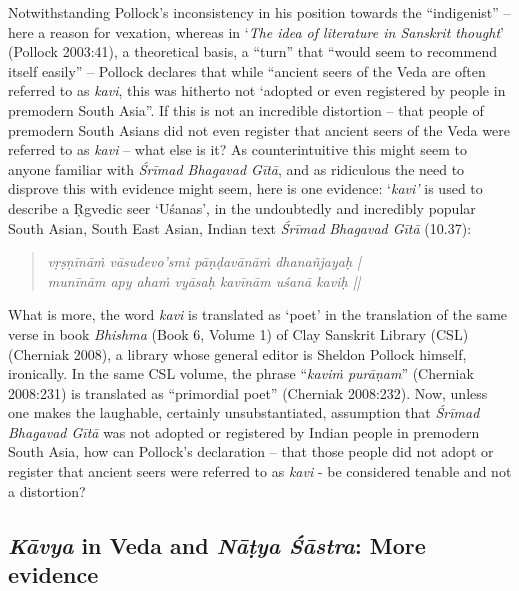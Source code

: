 Notwithstanding Pollock’s inconsistency in his position towards the “indigenist” – here a reason for vexation, whereas in ‘\textit{The idea of literature in Sanskrit thought}’ (Pollock 2003:41), a theoretical basis, a “turn” that “would seem to recommend itself easily” – Pollock declares that while “ancient seers of the Veda are often referred to as \textit{kavi}, this was hitherto not ‘adopted or even registered by people in premodern South Asia”. If this is not an incredible distortion – that people of premodern South Asians did not even register that ancient seers of the Veda were referred to as \textit{kavi} – what else is it? As counterintuitive this might seem to anyone familiar with \textit{Śrīmad Bhagavad Gītā}, and as ridiculous the need to disprove this with evidence might seem, here is one evidence: ‘\textit{kavi’} is used to describe a Ṛgvedic seer ‘Uśanas’, in the undoubtedly and incredibly popular South Asian, South East Asian, Indian text \textit{Śrīmad} \textit{Bhagavad Gītā} (10.37):

\begin{verse}
\textit{vṛṣṇīnāṁ vāsudevo’smi pāṇḍavānāṁ dhanañjayaḥ |}\\\textit{munīnām apy ahaṁ vyāsaḥ kavīnām uśanā kaviḥ ||}
\end{verse}

What is more, the word \textit{kavi} is translated as ‘poet’ in the translation of the same verse in book \textit{Bhishma} (Book 6, Volume 1) of Clay Sanskrit Library (CSL) (Cherniak 2008), a library whose general editor is Sheldon Pollock himself, ironically. In the same CSL volume, the phrase “\textit{kaviṁ purāṇam}” (Cherniak 2008:231) is translated as “primordial poet” (Cherniak 2008:232). Now, unless one makes the laughable, certainly unsubstantiated, assumption that \textit{Śrīmad} \textit{Bhagavad Gītā} was not adopted or registered by Indian people in premodern South Asia, how can Pollock’s declaration – that those people did not adopt or register that ancient seers were referred to as \textit{kavi} - be considered tenable and not a distortion?


\subsection{\textit{Kāvya} in Veda and \textit{Nāṭya Śāstra}: More evidence}

